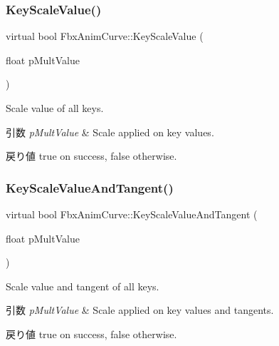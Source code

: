 \subsubsection{\texorpdfstring{Key\+Scale\+Value()}{KeyScaleValue()}}
{\footnotesize\ttfamily virtual bool Fbx\+Anim\+Curve\+::\+Key\+Scale\+Value (\begin{DoxyParamCaption}\item[{float}]{p\+Mult\+Value }\end{DoxyParamCaption})\hspace{0.3cm}{\ttfamily [pure virtual]}}

Scale value of all keys. 
\begin{DoxyParams}{引数}
{\em p\+Mult\+Value} & Scale applied on key values. \\
\hline
\end{DoxyParams}
\begin{DoxyReturn}{戻り値}
{\ttfamily true} on success, {\ttfamily false} otherwise. 
\end{DoxyReturn}
\mbox{\label{class_fbx_anim_curve_a2f09fd7ebeb68f8aa34f53926daf538b}} 
\subsubsection{\texorpdfstring{Key\+Scale\+Value\+And\+Tangent()}{KeyScaleValueAndTangent()}}
{\footnotesize\ttfamily virtual bool Fbx\+Anim\+Curve\+::\+Key\+Scale\+Value\+And\+Tangent (\begin{DoxyParamCaption}\item[{float}]{p\+Mult\+Value }\end{DoxyParamCaption})\hspace{0.3cm}{\ttfamily [pure virtual]}}

Scale value and tangent of all keys. 
\begin{DoxyParams}{引数}
{\em p\+Mult\+Value} & Scale applied on key values and tangents. \\
\hline
\end{DoxyParams}
\begin{DoxyReturn}{戻り値}
{\ttfamily true} on success, {\ttfamily false} otherwise. 
\end{DoxyReturn}
\mbox{\label{class_fbx_anim_curve_a8f36f89bd5fbaa4f180789f4d9faf84f}} 
